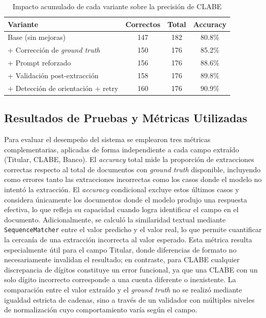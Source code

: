 \begin{table}[H]
\centering
\vspace{6pt}
\begin{tabular}{lccc}
\toprule
\textbf{Variante} & \textbf{Correctos} & \textbf{Total} & \textbf{Accuracy} \\
\midrule
Base (sin mejoras)                  & 147 & 182 & 80.8\% \\
+ Corrección de \textit{ground truth}       & 150 & 176 & 85.2\% \\
+ Prompt reforzado                  & 156 & 176 & 88.6\% \\
+ Validación post-extracción        & 158 & 176 & 89.8\% \\
+ Detección de orientación + retry  & 160 & 176 & 90.9\% \\
\bottomrule
\end{tabular}
\caption{Impacto acumulado de cada variante sobre la precisión de CLABE}
\label{tab:impacto-variantes}
\end{table}



\subsection{Resultados de Pruebas y Métricas Utilizadas}

Para evaluar el desempeño del sistema se emplearon tres métricas complementarias, aplicadas de forma independiente a cada campo extraído (Titular, CLABE, Banco). El \textit{accuracy} total mide la proporción de extracciones correctas respecto al total de documentos con \textit{ground truth} disponible, incluyendo como errores tanto las extracciones incorrectas como los casos donde el modelo no intentó la extracción. El \textit{accuracy} condicional excluye estos últimos casos y considera únicamente los documentos donde el modelo produjo una respuesta efectiva, lo que refleja su capacidad cuando logra identificar el campo en el documento. Adicionalmente, se calculó la similaridad textual mediante \texttt{SequenceMatcher} entre el valor predicho y el valor real, lo que permite cuantificar la cercanía de una extracción incorrecta al valor esperado. Esta métrica resulta especialmente útil para el campo Titular, donde diferencias de formato no necesariamente invalidan el resultado; en contraste, para CLABE cualquier discrepancia de dígitos constituye un error funcional, ya que una CLABE con un solo dígito incorrecto corresponde a una cuenta diferente o inexistente. La comparación entre el valor extraído y el \textit{ground truth} no se realizó mediante igualdad estricta de cadenas, sino a través de un validador con múltiples niveles de normalización cuyo comportamiento varía según el campo. 

